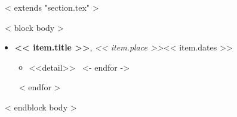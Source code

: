~< extends "section.tex" >~

~< block body >~
  \begin{itemize}
    ~< for item in items >~
      \item {\bf << item.title >>}, {\it << item.place >>}\hfill << item.dates >>
        \begin{itemize}
          ~< for detail in item.details ->~
            \item <<detail>>
          ~<- endfor ->~
        \end{itemize}
    ~< endfor >~
  \end{itemize}
~< endblock body >~
